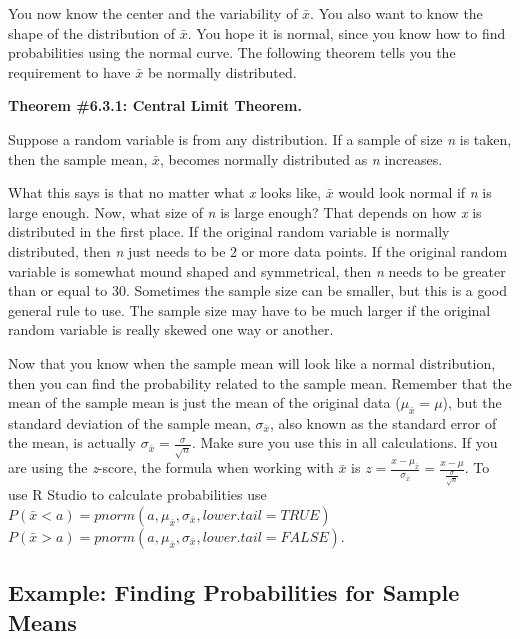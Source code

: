 \documentclass[
]{book}
\begin{document}
You now know the center and the variability of \(\bar{x}\). You also want to know the shape of the distribution of \(\bar{x}\). You hope it is normal, since you know how to find probabilities using the normal curve. The following theorem tells you the requirement to have \(\bar{x}\) be normally distributed.

\textbf{Theorem \#6.3.1: Central Limit Theorem.}

Suppose a random variable is from any distribution. If a sample of size \emph{n} is taken, then the sample mean, \(\bar{x}\), becomes normally distributed as \emph{n} increases.

What this says is that no matter what \emph{x} looks like, \(\bar{x}\) would look normal if \emph{n} is large enough. Now, what size of \emph{n} is large enough? That depends on how \emph{x} is distributed in the first place. If the original random variable is normally distributed, then \emph{n} just needs to be 2 or more data points. If the original random variable is somewhat mound shaped and symmetrical, then \emph{n} needs to be greater than or equal to 30. Sometimes the sample size can be smaller, but this is a good general rule to use. The sample size may have to be much larger if the original random variable is really skewed one way or another.

Now that you know when the sample mean will look like a normal distribution, then you can find the probability related to the sample mean. Remember that the mean of the sample mean is just the mean of the original data (\(\mu_{\bar{x}}=\mu\)), but the standard deviation of the sample mean, \(\sigma_{\bar{x}}\), also known as the standard error of the mean, is actually \(\sigma_{\bar{x}}=\frac{\sigma}{\sqrt{n}}\). Make sure you use this in all calculations. If you are using the \emph{z}-score, the formula when working with \(\bar{x}\) is \(z=\frac{x-\mu_{\bar{x}}}{\sigma_{\bar{x}}}=\frac{x-\mu}{\frac{\sigma}{\sqrt{n}}}\).
To use R Studio to calculate probabilities use
\(P(\bar{x}<a)= pnorm(a, \mu_{\bar{x}}, \sigma_{\bar{x}}, lower.tail=TRUE)\)
\(P(\bar{x}>a)= pnorm(a, \mu_{\bar{x}}, \sigma_{\bar{x}}, lower.tail=FALSE)\).

\hypertarget{example-finding-probabilities-for-sample-means}{%
\subsection{Example: Finding Probabilities for Sample Means}\label{example-finding-probabilities-for-sample-means}}
\end{document}
